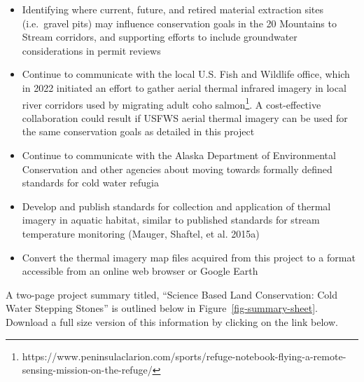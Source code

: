 \documentclass[
  letterpaper,
  DIV=11,
  numbers=noendperiod]{scrreprt}
\begin{document}
\begin{itemize}
\item
  Identifying where current, future, and retired material extraction
  sites (i.e.~gravel pits) may influence conservation goals in the 20
  Mountains to Stream corridors, and supporting efforts to include
  groundwater considerations in permit reviews
\item
  Continue to communicate with the local U.S. Fish and Wildlife office,
  which in 2022 initiated an effort to gather aerial thermal infrared
  imagery in local river corridors used by migrating adult coho
  salmon\footnote{https://www.peninsulaclarion.com/sports/refuge-notebook-flying-a-remote-sensing-mission-on-the-refuge/}.
  A cost-effective collaboration could result if USFWS aerial thermal
  imagery can be used for the same conservation goals as detailed in
  this project
\item
  Continue to communicate with the Alaska Department of Environmental
  Conservation and other agencies about moving towards formally defined
  standards for cold water refugia
\item
  Develop and publish standards for collection and application of
  thermal imagery in aquatic habitat, similar to published standards for
  stream temperature monitoring (Mauger, Shaftel, et al. 2015a)
\item
  Convert the thermal imagery map files acquired from this project to a
  format accessible from an online web browser or Google Earth
\end{itemize}

A two-page project summary titled, ``Science Based Land Conservation:
Cold Water Stepping Stones'' is outlined below in
Figure~\ref{fig-summary-sheet}. Download a full size version of this
information by clicking on the link below.
\end{document}

